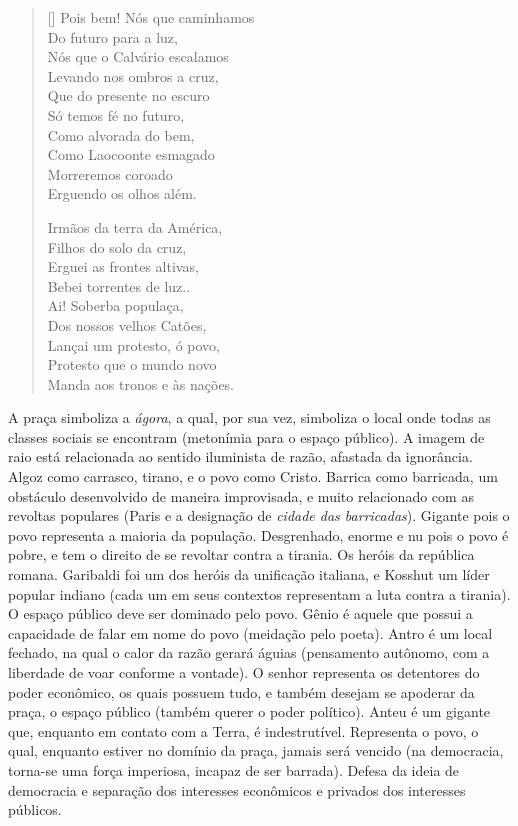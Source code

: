 \documentclass[12pt]{book}
\begin{document}
\begin{verse}[\versewidth]
					Pois bem! Nós que caminhamos \\
					Do futuro para a luz, \\
					Nós que o Calvário escalamos \\
					Levando nos ombros a cruz, \\
					Que do presente no escuro \\
					Só temos fé no futuro, \\
					Como alvorada do bem, \\
					Como Laocoonte esmagado \\
					Morreremos coroado \\
					Erguendo os olhos além. 
					
					Irmãos da terra da América, \\
					Filhos do solo da cruz, \\
					Erguei as frontes altivas, \\
					Bebei torrentes de luz..\\
					Ai! Soberba populaça, \\
					Dos nossos velhos Catões, \\
					Lançai um protesto, ó povo, \\
					Protesto que o mundo novo \\
					Manda aos tronos e às nações.
				\end{verse}
				\par A praça simboliza a \textit{ágora}, a qual, por sua vez, simboliza o local onde todas as classes sociais se encontram (metonímia para o espaço público). A imagem de raio está relacionada ao sentido iluminista de razão, afastada da ignorância. Algoz como carrasco, tirano, e o povo como Cristo. Barrica como barricada, um obstáculo desenvolvido de maneira improvisada, e muito relacionado com as revoltas populares (Paris e a designação de \textit{cidade das barricadas}). Gigante pois o povo representa a maioria da população. Desgrenhado, enorme e nu pois o povo é pobre, e tem o direito de se revoltar contra a tirania. Os heróis da república romana. Garibaldi foi um dos heróis da unificação italiana, e Kosshut um líder popular indiano (cada um em seus contextos representam a luta contra a tirania). O espaço público deve ser dominado pelo povo. Gênio é aquele que possui a capacidade de falar em nome do povo (meidação pelo poeta). Antro é um local fechado, na qual o calor da razão gerará águias (pensamento autônomo, com a liberdade de voar conforme a vontade). O senhor representa os detentores do poder econômico, os quais possuem tudo, e também desejam se apoderar da praça, o espaço público (também querer o poder político). Anteu é um gigante que, enquanto em contato com a Terra, é indestrutível. Representa o povo, o qual, enquanto estiver no domínio da praça, jamais será vencido (na democracia, torna-se uma força imperiosa, incapaz de ser barrada). Defesa da ideia de democracia e separação dos interesses econômicos e privados dos interesses públicos.
\end{document}
